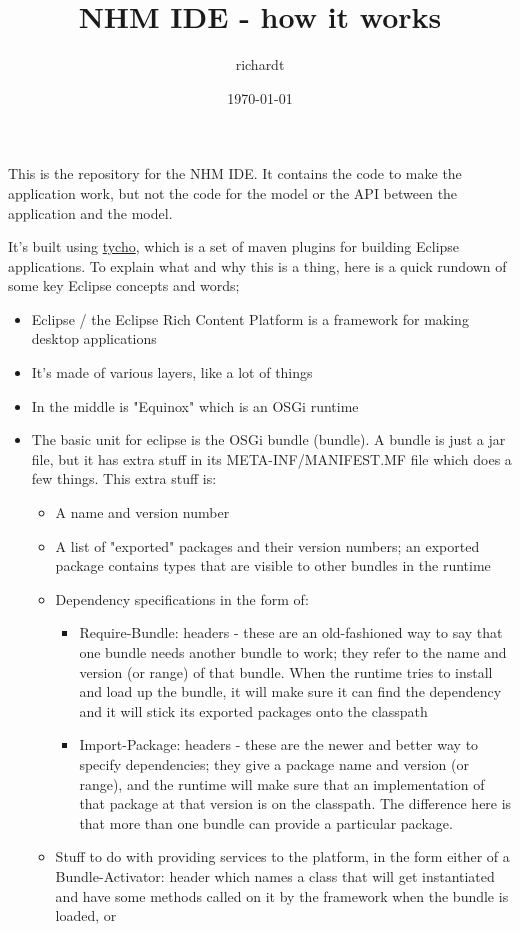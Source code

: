 \documentclass[11pt]{article}
\author{richardt}
\date{\today}
\title{NHM IDE - how it works}
\begin{document}
\maketitle
\tableofcontents

This is the repository for the NHM IDE. It contains the code to make the application work, but not the code for the model or the API between the application and the model.

It's built using \href{https://eclipse.org/tycho/}{tycho}, which is a set of maven plugins for building Eclipse applications. To explain what and why this is a thing, here is a quick rundown of some key Eclipse concepts and words;

\begin{itemize}
\item Eclipse / the Eclipse Rich Content Platform is a framework for making desktop applications
\item It's made of various layers, like a lot of things
\item In the middle is "Equinox" which is an OSGi runtime
\item The basic unit for eclipse is the OSGi bundle (bundle). A bundle is just a jar file, but it has extra stuff in its META-INF/MANIFEST.MF file which does a few things. This extra stuff is:
\begin{itemize}
\item A name and version number
\item A list of "exported" packages and their version numbers; an exported package contains types that are visible to other bundles in the runtime
\item Dependency specifications in the form of:
\begin{itemize}
\item Require-Bundle: headers - these are an old-fashioned way to say that one bundle needs another bundle to work; they refer to the name and version (or range) of that bundle. When the runtime tries to install and load up the bundle, it will make sure it can find the dependency and it will stick its exported packages onto the classpath
\item Import-Package: headers - these are the newer and better way to specify dependencies; they give a package name and version (or range), and the runtime will make sure that an implementation of that package at that version is on the classpath. The difference here is that more than one bundle can provide a particular package.
\end{itemize}
\item Stuff to do with providing services to the platform, in the form either of a Bundle-Activator: header which names a class that will get instantiated and have some methods called on it by the framework when the bundle is loaded, or

\end{itemize}
\end{itemize}
\end{document}
